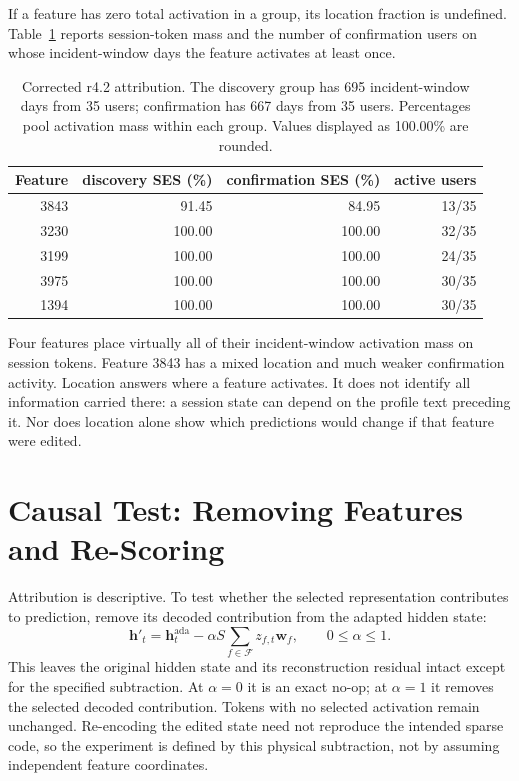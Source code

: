 \documentclass[12pt]{report}
\begin{document}
If a feature has zero total activation in a group, its location fraction is undefined.
Table~\ref{tab:attribution} reports session-token mass and the number of confirmation users
on whose incident-window days the feature activates at least once.
\begin{table}[!htbp]
\centering
\caption[Sparse-feature activation location]{Corrected r4.2 attribution. The discovery group has 695 incident-window days
from 35 users; confirmation has 667 days from 35 users. Percentages pool activation mass
within each group. Values displayed as 100.00\% are rounded.}
\label{tab:attribution}
\begin{tabular}{rrrr}
\toprule
Feature & discovery SES (\%) & confirmation SES (\%) & active users \\
\midrule
3843 & 91.45 & 84.95 & 13/35 \\
3230 & 100.00 & 100.00 & 32/35 \\
3199 & 100.00 & 100.00 & 24/35 \\
3975 & 100.00 & 100.00 & 30/35 \\
1394 & 100.00 & 100.00 & 30/35 \\
\bottomrule
\end{tabular}
\end{table}
Four features place virtually all of their incident-window activation mass on session tokens.
Feature 3843 has a mixed location and much weaker confirmation activity. Location answers
where a feature activates. It does not identify all information carried there: a session
state can depend on the profile text preceding it. Nor does location alone show which
predictions would change if that feature were edited.

\section{Causal Test: Removing Features and Re-Scoring}
Attribution is descriptive. To test whether the selected representation contributes to
prediction, remove its decoded contribution from the adapted hidden state:
\begin{equation}
\mathbf h'_t=\mathbf h_t^{\mathrm{ada}}
 -\alpha S\sum_{f\in\mathcal F}z_{f,t}\mathbf w_f,
\qquad 0\leq\alpha\leq1.
\label{eq:ablation}
\end{equation}
This leaves the original hidden state and its reconstruction residual intact except for the
specified subtraction. At $\alpha=0$ it is an exact no-op; at $\alpha=1$ it removes the
selected decoded contribution. Tokens with no selected activation remain unchanged.
Re-encoding the edited state need not reproduce the intended sparse code, so the experiment
is defined by this physical subtraction, not by assuming independent feature coordinates.
\end{document}
